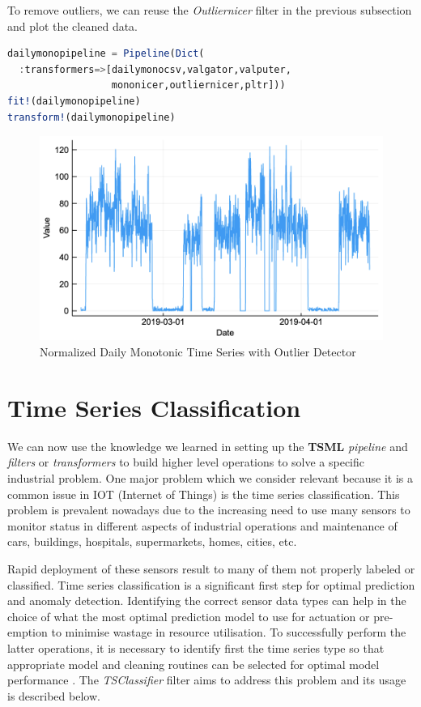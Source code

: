 \documentclass{juliacon}
\begin{document}
To remove outliers, we can reuse the \emph{Outliernicer} filter in the previous subsection and plot the cleaned data.

\begin{lstlisting}[language = Julia]
dailymonopipeline = Pipeline(Dict(
  :transformers=>[dailymonocsv,valgator,valputer,
                  mononicer,outliernicer,pltr]))
fit!(dailymonopipeline)
transform!(dailymonopipeline)
\end{lstlisting}

\begin{figure}[htbp]
   \centering
   \includegraphics[width=\columnwidth]{outnormdailymono.png}  %
   \caption{Normalized Daily Monotonic Time Series with Outlier Detector}
   \label{fig:outndailymono}
\end{figure}


\section{Time Series Classification}

We can now use the knowledge we learned in setting up the \textbf{TSML}
\emph{pipeline} and \emph{filters} or \emph{transformers} to build higher level
operations to solve a specific industrial problem. One major problem
which we consider relevant because it is a common issue in IOT (Internet of Things) 
 is the time series classification. This problem is prevalent nowadays 
due to the increasing need to use many sensors to monitor status in different aspects of industrial
operations and maintenance of cars, buildings, hospitals, supermarkets, homes, cities, etc.

\vskip 6pt

Rapid deployment of these sensors result to many of them not properly labeled or classified.
Time series classification is a significant first step for optimal prediction and anomaly detection.
Identifying the correct sensor data types can help in the choice of what the most optimal prediction 
model to use for actuation or pre-emption to minimise wastage in resource utilisation.
To successfully perform the latter operations, it is necessary to identify first the time series
type so that appropriate model and cleaning routines can be selected for optimal model performance . 
The  \emph{TSClassifier} filter aims to address this problem and its usage is described below.
\end{document}
